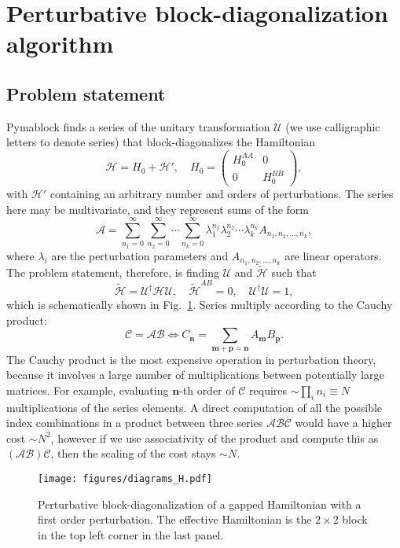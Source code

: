 \section{Perturbative block-diagonalization algorithm}

\subsection{Problem statement}

Pymablock finds a series of the unitary transformation $\mathcal{U}$ (we use
calligraphic letters to denote series) that block-diagonalizes the Hamiltonian
%
\begin{equation}
\label{eq:hamiltonian}
\mathcal{H} = H_0 + \mathcal{H}',\quad H_0 = \begin{pmatrix}
H_0^{AA} & 0\\
0 & H_0^{BB}
\end{pmatrix},
\end{equation}
%
with $\mathcal{H}'$ containing an arbitrary number and orders of perturbations.
The series here may be multivariate, and they represent sums of the form
%
\begin{equation}
\mathcal{A} = \sum_{n_1=0}^\infty \sum_{n_2=0}^\infty \cdots \sum_{n_k=0}^\infty \lambda_1^{n_1} \lambda_2^{n_2} \cdots \lambda_k^{n_k} A_{n_1, n_2, \ldots, n_k},
\end{equation}
%
where $\lambda_i$ are the perturbation parameters and $A_{n_1, n_2, \ldots,
n_k}$ are linear operators.
%
The problem statement, therefore, is finding $\mathcal{U}$ and
$\tilde{\mathcal{H}}$ such that
%
\begin{equation}
\label{eq:problem_definition}
\tilde{\mathcal{H}} = \mathcal{U}^\dagger \mathcal{H} \mathcal{U},\quad \tilde{\mathcal{H}}^{AB} = 0,\quad \mathcal{U}^\dagger \mathcal{U} = 1,
\end{equation}
%
which is schematically shown in Fig.~\ref{fig:block_diagonalization}.
Series multiply according to the Cauchy product:
%
$$
\mathcal{C} = \mathcal{A}\mathcal{B} \Leftrightarrow C_\mathbf{n} = \sum_{\mathbf{m} + \mathbf{p} = \mathbf{n}} A_\mathbf{m} B_\mathbf{p}.
$$
%
The Cauchy product is the most expensive operation in perturbation theory,
because it involves a large number of multiplications between potentially large
matrices.
For example, evaluating $\mathbf{n}$-th order of $\mathcal{C}$ requires
$\sim\prod_i n_i \equiv N$ multiplications of the series elements.
A direct computation of all the possible index combinations in a product
between three series $\mathcal{A}\mathcal{B}\mathcal{C}$ would have a higher
cost $\sim N^2$, however if we use associativity of the product and compute
this as $(\mathcal{A}\mathcal{B})\mathcal{C}$, then the scaling of the cost
stays $\sim N$.
%
\begin{figure}[h!]
\centering
\texttt{[image: figures/diagrams\_H.pdf]}
\caption{
  Perturbative block-diagonalization of a gapped Hamiltonian with a first order
  perturbation.
  The effective Hamiltonian is the $2\times 2$ block in the top left corner in
  the last panel.
}
\label{fig:block_diagonalization}
\end{figure}

